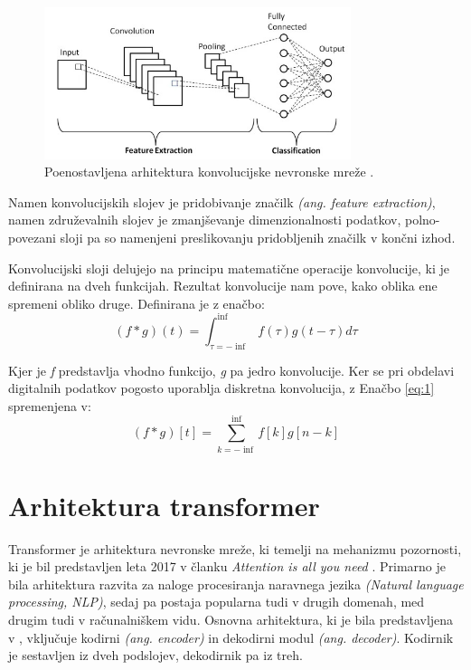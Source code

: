 \documentclass[a4paper,12pt,openright]{book}
\begin{document}
\begin{figure}[htb]
    \begin{center}
        \includegraphics[width=0.8\textwidth]{img/cnn.jpg}
    \end{center}
    \caption{Poenostavljena arhitektura konvolucijske nevronske mreže \cite{cnn}.}
    \label{img:cnn}
\end{figure}

Namen konvolucijskih slojev je pridobivanje značilk \emph{(ang. feature extraction)}, namen združevalnih slojev je zmanjševanje dimenzionalnosti podatkov, polno-povezani sloji pa so namenjeni preslikovanju pridobljenih značilk v končni izhod.

Konvolucijski sloji delujejo na principu matematične operacije konvolucije, ki je definirana na dveh funkcijah. Rezultat konvolucije nam pove, kako oblika ene spremeni obliko druge. Definirana je z enačbo:
\begin{equation}
    (f*g)(t)=\int_{\tau=-\inf}^{\inf}f(\tau)g(t-\tau)d\tau
    \label{eq:1}
\end{equation}

Kjer je \emph{f} predstavlja vhodno funkcijo, \emph{g} pa jedro konvolucije. Ker se pri obdelavi digitalnih podatkov pogosto uporablja diskretna konvolucija, z Enačbo \ref{eq:1} spremenjena v:
\begin{equation}
    (f*g)[t]=\sum_{k=-\inf}^{\inf}f[k]g[n - k]
    \label{eq:2}
\end{equation}

\section{Arhitektura transformer}
Transformer je arhitektura nevronske mreže, ki temelji na mehanizmu pozornosti, ki je bil predstavljen leta 2017 v članku \emph{Attention is all you need} \cite{attention_is_all_you_need}. Primarno je bila arhitektura razvita za naloge procesiranja naravnega jezika \emph{(Natural language processing, NLP)}, sedaj pa postaja popularna tudi v drugih domenah, med drugim tudi v računalniškem vidu. Osnovna arhitektura, ki je bila predstavljena v \cite{attention_is_all_you_need}, vključuje kodirni \emph{(ang. encoder)} in dekodirni modul \emph{(ang. decoder)}. Kodirnik je sestavljen iz dveh podslojev, dekodirnik pa iz treh.
\end{document}
